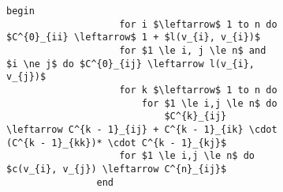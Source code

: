 \documentclass{subfiles}
\begin{document}
\begin{figure}[!h]
    \centering
    \begin{subfigure}[b]{0.65\textwidth}
        \begin{lstlisting}[language = algol]
                begin
                    for i $\leftarrow$ 1 to n do $C^{0}_{ii} \leftarrow$ 1 + $l(v_{i}, v_{i})$
                    for $1 \le i, j \le n$ and $i \ne j$ do $C^{0}_{ij} \leftarrow l(v_{i}, v_{j})$
                    for k $\leftarrow$ 1 to n do
                        for $1 \le i,j \le n$ do
                            $C^{k}_{ij} \leftarrow C^{k - 1}_{ij} + C^{k - 1}_{ik} \cdot (C^{k - 1}_{kk})* \cdot C^{k - 1}_{kj}$
                    for $1 \le i,j \le n$ do $c(v_{i}, v_{j}) \leftarrow C^{n}_{ij}$
                end 
            \end{lstlisting}
    \end{subfigure}
    \label{Fig:}
\end{figure}
\end{document}
